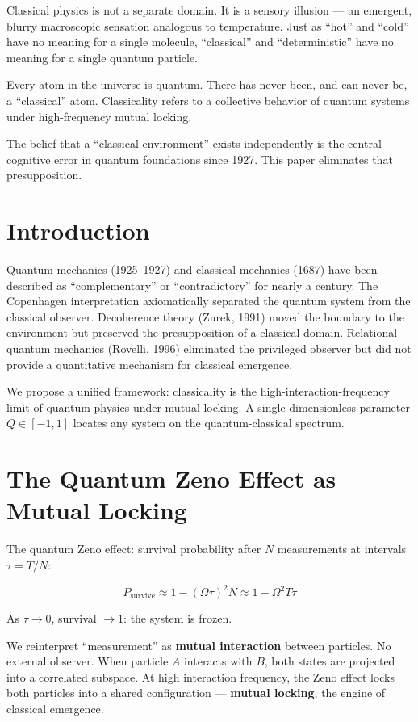 \documentclass[12pt]{article}
\begin{document}
Classical physics is not a separate domain. It is a sensory illusion — an emergent, blurry macroscopic sensation analogous to temperature. Just as ``hot'' and ``cold'' have no meaning for a single molecule, ``classical'' and ``deterministic'' have no meaning for a single quantum particle.

Every atom in the universe is quantum. There has never been, and can never be, a ``classical'' atom. Classicality refers to a collective behavior of quantum systems under high-frequency mutual locking.

The belief that a ``classical environment'' exists independently is the central cognitive error in quantum foundations since 1927. This paper eliminates that presupposition.

\section{Introduction}

Quantum mechanics (1925--1927) and classical mechanics (1687) have been described as ``complementary'' or ``contradictory'' for nearly a century. The Copenhagen interpretation axiomatically separated the quantum system from the classical observer. Decoherence theory (Zurek, 1991) moved the boundary to the environment but preserved the presupposition of a classical domain. Relational quantum mechanics (Rovelli, 1996) eliminated the privileged observer but did not provide a quantitative mechanism for classical emergence.

We propose a unified framework: classicality is the high-interaction-frequency limit of quantum physics under mutual locking. A single dimensionless parameter $Q \in [-1, 1]$ locates any system on the quantum-classical spectrum.

\section{The Quantum Zeno Effect as Mutual Locking}

The quantum Zeno effect: survival probability after $N$ measurements at intervals $\tau = T/N$:

\begin{equation}
P_{\text{survive}} \approx 1 - (\Omega\tau)^2 N \approx 1 - \Omega^2 T \tau
\end{equation}

As $\tau \to 0$, survival $\to 1$: the system is frozen.

We reinterpret ``measurement'' as \textbf{mutual interaction} between particles. No external observer. When particle $A$ interacts with $B$, both states are projected into a correlated subspace. At high interaction frequency, the Zeno effect locks both particles into a shared configuration — \textbf{mutual locking}, the engine of classical emergence.
\end{document}
